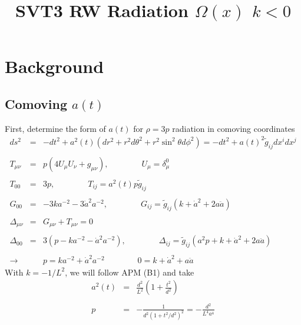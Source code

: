 \documentclass[10pt,letterpaper]{article}
\title{SVT3 RW Radiation $\Omega(x)$ $k<0$}
\date{}
\numberwithin{equation}{section}
\begin{document}
 
\maketitle
\noindent 
\section{Background}

\subsection{Comoving $a(t)$}
First, determine the form of $a(t)$ for $\rho = 3p$ radiation in comoving coordinates
\begin{eqnarray}
ds^2 &=& -dt^2 + a^2(t)(dr^2 + r^2d\theta^2 + r^2\sin^2\theta d\phi^2) = -dt^2 + a(t)^2 \tilde g_{ij} dx^i dx^j
\\ \nonumber\\
T_{\mu\nu} &=& p(4U_\mu U_\nu + g_{\mu\nu}),\qquad\qquad U_\mu = \delta^0_\mu
\\ \nonumber\\
T_{00} &=& 3p,\qquad\qquad T_{ij} = a^2(t)p \tilde g_{ij}
\\ \nonumber\\
G_{00} &=& -3k a^{-2} -3 \dot a^2 a^{-2},\qquad\qquad G_{ij} = \tilde g_{ij}(k + \dot a^2 + 2 a \ddot a)
\\ \nonumber\\
\Delta_{\mu\nu} &=& G_{\mu\nu}+ T_{\mu\nu} = 0
\\ \nonumber\\
\Delta_{00} &=& 3( p- ka^{-2} -\dot a^2 a^{-2}), \qquad\qquad
\Delta_{ij} = \tilde g_{ij}( a^2 p +k + \dot a^2 + 2a \ddot a)
\\ \nonumber\\
\to  &&\boxed{p= k a^{-2} + \dot a^2 a^{-2}}
\qquad\qquad \boxed{0= k + \dot a^2 + a\ddot a}
\end{eqnarray}
With $k=-1/L^2$, we will follow APM (B1) and take 
\begin{eqnarray}
a^2(t) &=& \frac{d^2}{L^2}\left( 1+ \frac{t^2}{d^2}\right)
\label{a(t)}
\\ \nonumber\\
p &=& -\frac{1}{d^2(1+t^2/d^2)^2} = -\frac{d^2}{L^4 a^4}
\end{eqnarray}

\end{document}
